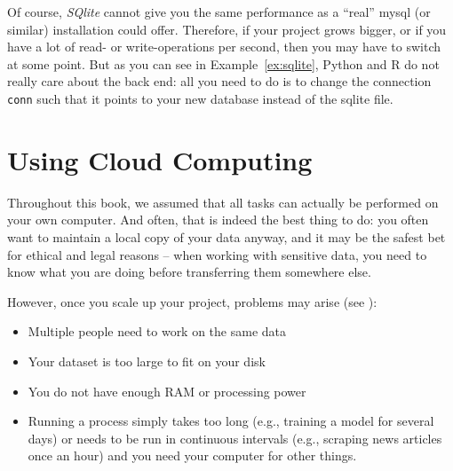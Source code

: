 
Of course, \emph{SQlite} cannot give you the same performance as a ``real'' mysql (or similar) installation could offer. Therefore, if your project grows bigger, or if you have a lot of read-
 or
write-operations per second, then you may have to switch at some
point. But as you can see in Example~\ref{ex:sqlite}, Python and R do not
really care about the back end: all you need to do is to change the
connection \verb|conn| such that it points to your new database instead of
the sqlite file.


%

\section{Using Cloud Computing}
\label{sec:cloudcomputing}

Throughout this book, we assumed that all tasks can actually be
performed on your own computer. And often, that is indeed the best
thing to do: you often want to maintain a local copy of your data
anyway, and it may be the safest bet for ethical and legal reasons --
when working with sensitive data, you need to know what you are doing
before transferring them somewhere else.

However, once you scale up your project, problems may arise (see \cite{Trilling2018b}):
\begin{itemize}
\item Multiple people need to work on the same data
\item Your dataset is too large to fit on your disk
\item You do not have enough RAM or processing power
\item Running a process simply takes too long (e.g., training a model
  for several days) or needs to be run in continuous intervals (e.g.,
  scraping news articles once an hour) and you need your computer for
  other things.
\end{itemize}

